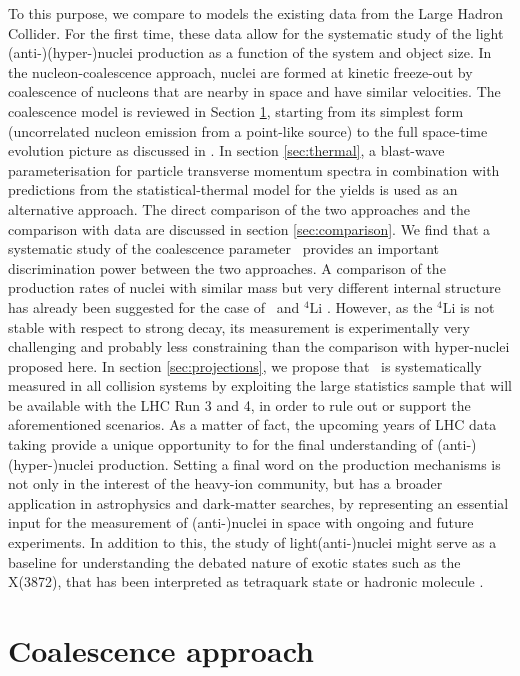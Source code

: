 \documentclass[a4paper,11pt]{scrartcl} %
\begin{document}
To this purpose, we compare to models the existing data from the Large Hadron Collider. For the first time, these data allow for the systematic study of the light (anti-)(hyper-)nuclei production as a function of the system and object size. 
In the nucleon-coalescence approach, nuclei are formed at kinetic freeze-out by coalescence of nucleons that are nearby in space and have similar velocities. The coalescence model is reviewed in Section \ref{sec:coalescence}, starting from its simplest form (uncorrelated nucleon emission from a point-like source) to the full space-time evolution picture as discussed in \cite{Scheibl:1998tk}. In section \ref{sec:thermal}, a blast-wave parameterisation for particle transverse momentum spectra in combination with predictions from the statistical-thermal model for the yields is used as an alternative approach. 
The direct comparison of the two approaches and the comparison with data are discussed in section \ref{sec:comparison}.
We find that a systematic study of the coalescence parameter \bA~provides an important discrimination power between the two approaches. 
A comparison of the production rates of nuclei with similar mass but very different internal structure has already been suggested for the case of \hefour~and ${}^{4}\mathrm{Li}$ \cite{Bazak:2018hgl}. However, as the ${}^{4}\mathrm{Li}$ is not stable with respect to strong decay, its measurement is experimentally very challenging and probably less constraining than the comparison with hyper-nuclei proposed here.
In section \ref{sec:projections}, we propose that \bA~is systematically measured in all collision systems by exploiting the large statistics sample that will be available with the LHC Run 3 and 4, in order to rule out or support the aforementioned scenarios. As a matter of fact, the upcoming years of LHC data taking provide a unique opportunity to for the final understanding of (anti-)(hyper-)nuclei production.
Setting a final word on the production mechanisms is not only in the interest of the heavy-ion community, but has a broader application in astrophysics and dark-matter searches, by representing an essential input for the measurement of (anti-)nuclei in space with ongoing \cite{Alcaraz:2000ss} and future \cite{AMS100, Aramaki:2015laa} experiments. 
In addition to this, the study of light(anti-)nuclei might serve as a baseline for understanding the debated nature of exotic states such as the X(3872), that has been interpreted as tetraquark state or hadronic molecule \cite{Esposito:2015fsa, Cho:2017dcy}.


\section{Coalescence approach} 
\label{sec:coalescence}
\end{document}

